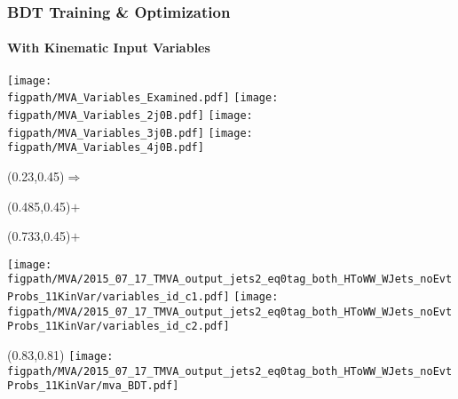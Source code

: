 \begin{frame}
	\frametitle{BDT Training \& Optimization}
	\framesubtitle{With Kinematic Input Variables}
	
	\texttt{[image: \\figpath/MVA\_Variables\_Examined.pdf]}%
	\hspace*{0.05\textwidth}\texttt{[image: \\figpath/MVA\_Variables\_2j0B.pdf]}%
	\hspace*{0.05\textwidth}\texttt{[image: \\figpath/MVA\_Variables\_3j0B.pdf]}%
	\hspace*{0.05\textwidth}\texttt{[image: \\figpath/MVA\_Variables\_4j0B.pdf]}%
	\begin{textblock}{0.2}(0.23,0.45){\color{red}$\Rightarrow$}\end{textblock}
	\begin{textblock}{0.2}(0.485,0.45){\color{blue}$+$}\end{textblock}
	\begin{textblock}{0.2}(0.733,0.45){\color{blue}$+$}\end{textblock}

	\texttt{[image: \\figpath/MVA/2015\_07\_17\_TMVA\_output\_jets2\_eq0tag\_both\_HToWW\_WJets\_noEvtProbs\_11KinVar/variables\_id\_c1.pdf]}%
	\texttt{[image: \\figpath/MVA/2015\_07\_17\_TMVA\_output\_jets2\_eq0tag\_both\_HToWW\_WJets\_noEvtProbs\_11KinVar/variables\_id\_c2.pdf]}%
	\begin{textblock}{0.15}(0.83,0.81){
		\texttt{[image: \\figpath/MVA/2015\_07\_17\_TMVA\_output\_jets2\_eq0tag\_both\_HToWW\_WJets\_noEvtProbs\_11KinVar/mva\_BDT.pdf]}%
	}\end{textblock}
\end{frame}

